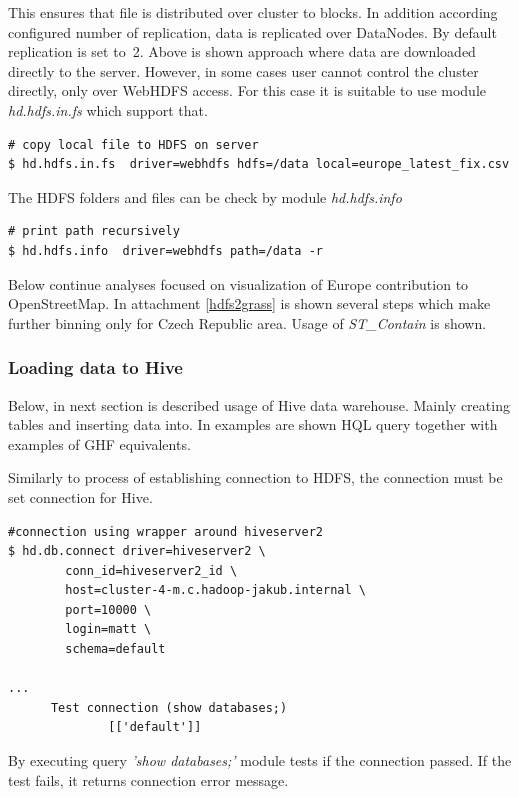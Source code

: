 \documentclass[a4paper,12pt,oneside]{report}
\begin{document}
	This ensures that file is distributed over cluster to blocks. In addition
	according  configured number of replication, data is replicated over DataNodes.
	By default replication is set to~2.
	Above is shown approach where data are downloaded directly to the server.
	However, in some cases user cannot control the cluster directly, only over
	WebHDFS access. For this case it is suitable to use module \textit{hd.hdfs.in.fs}
	which support that.
	\begin{footnotesize}
		\begin{lstlisting}[style=python]
# copy local file to HDFS on server
$ hd.hdfs.in.fs  driver=webhdfs hdfs=/data local=europe_latest_fix.csv
		\end{lstlisting}
	\end{footnotesize}
	The HDFS folders and files can be check by module \textit{hd.hdfs.info}
	\begin{footnotesize}
		\begin{lstlisting}[style=python]
# print path recursively
$ hd.hdfs.info  driver=webhdfs path=/data -r
		\end{lstlisting}
	\end{footnotesize}
	
	Below continue analyses focused on visualization of Europe contribution to OpenStreetMap. 
	In attachment \ref{hdfs2grass} is shown several steps which make further binning only for Czech
	Republic area. Usage of \textit{ST\_Contain} is shown. 
	

\subsubsection{Loading data to Hive}
	Below, in next section is described usage of Hive data warehouse. Mainly
	creating tables and inserting data into. In examples are shown HQL query
	together with examples of GHF equivalents.
	
	Similarly to process of establishing connection to HDFS,
	 the connection must be set connection for Hive.
\begin{footnotesize}
	\begin{lstlisting}[style=python]
#connection using wrapper around hiveserver2
$ hd.db.connect driver=hiveserver2 \
		conn_id=hiveserver2_id \
		host=cluster-4-m.c.hadoop-jakub.internal \
		port=10000 \
		login=matt \
		schema=default 
	 		
...
      Test connection (show databases;) 
              [['default']]
		\end{lstlisting}
	\end{footnotesize}
	By executing query \textit{'show databases;'} module tests if the connection
	passed. If the test fails, it returns connection error message.
	
\end{document}
